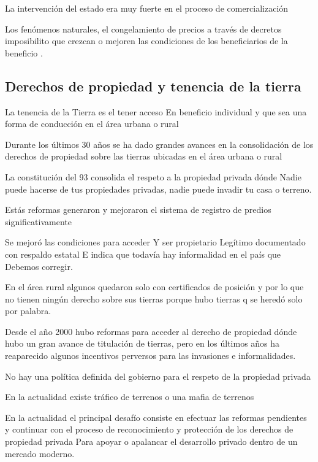 \documentclass[
  a4paper,
]{article}
\begin{document}
La intervención del estado era muy fuerte en el proceso de
comercialización

Los fenómenos naturales, el congelamiento de precios a través de
decretos imposibilito que crezcan o mejoren las condiciones de los
beneficiarios de la beneficio .

\hypertarget{derechos-de-propiedad-y-tenencia-de-la-tierra}{%
\subsection{Derechos de propiedad y tenencia de la
tierra}\label{derechos-de-propiedad-y-tenencia-de-la-tierra}}

La tenencia de la Tierra es el tener acceso En beneficio individual y
que sea una forma de conducción en el área urbana o rural

Durante los últimos 30 años se ha dado grandes avances en la
consolidación de los derechos de propiedad sobre las tierras ubicadas en
el área urbana o rural

La constitución del 93 consolida el respeto a la propiedad privada dónde
Nadie puede hacerse de tus propiedades privadas, nadie puede invadir tu
casa o terreno.

Estás reformas generaron y mejoraron el sistema de registro de predios
significativamente

Se mejoró las condiciones para acceder Y ser propietario Legítimo
documentado con respaldo estatal E indica que todavía hay informalidad
en el país que Debemos corregir.

En el área rural algunos quedaron solo con certificados de posición y
por lo que no tienen ningún derecho sobre sus tierras porque hubo
tierras q se heredó solo por palabra.

Desde el año 2000 hubo reformas para acceder al derecho de propiedad
dónde hubo un gran avance de titulación de tierras, pero en los últimos
años ha reaparecido algunos incentivos perversos para las invasiones e
informalidades.

No hay una política definida del gobierno para el respeto de la
propiedad privada

En la actualidad existe tráfico de terrenos o una mafia de terrenos

En la actualidad el principal desafío consiste en efectuar las reformas
pendientes y continuar con el proceso de reconocimiento y protección de
los derechos de propiedad privada Para apoyar o apalancar el desarrollo
privado dentro de un mercado moderno.
\end{document}
